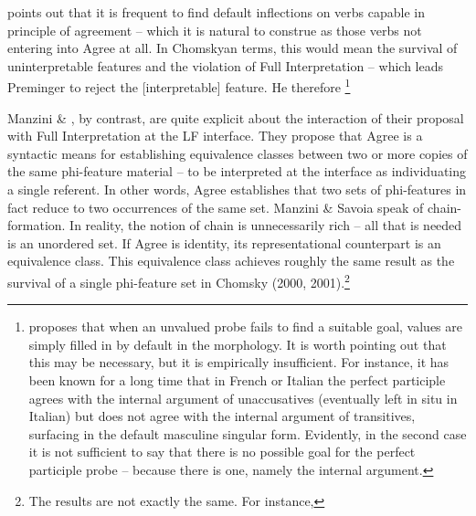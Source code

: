 \documentclass[output=paper]{langsci/langscibook}
\begin{document}
\citet{Preminger2014}{} points out that it is frequent to find default inflections on verbs capable in principle of agreement – which it is natural to construe as those verbs not entering into Agree at all.{} In Chomskyan terms, this would mean the survival of uninterpretable features and the violation of Full Interpretation – which leads Preminger to reject the [interpretable] feature. He therefore  \textstyle{[FB01?]}\footnote{\citet{Preminger2014} proposes that when an unvalued probe fails to find a suitable goal, values are simply filled in by default in the morphology. It is worth pointing out that this may be necessary, but it is empirically insufficient. For instance, it has been known for a long time \citep{Kayne1989} that in French or Italian the perfect participle agrees with the internal argument of unaccusatives (eventually left in situ in Italian) but does not agree with the internal argument of transitives, surfacing in the default masculine singular form. Evidently, in the second case it is not sufficient to say that there is no possible goal for the perfect participle probe – because there is one, namely the internal argument.} 

   Manzini \& \citet{Savoia2007}, by contrast, are quite explicit about the interaction of their proposal with Full Interpretation at the LF interface. They propose that Agree is a syntactic means for establishing equivalence classes between two or more copies of the same phi-feature material – to be interpreted at the interface as individuating a single referent. In other words, Agree establishes that two sets of phi-features in fact reduce to two occurrences of the same set. Manzini \& Savoia speak of chain-formation. In reality, the notion of chain is unnecessarily rich – all that is needed is an unordered set. If Agree is identity, its representational counterpart is an equivalence class. This equivalence class achieves roughly the same result as the survival of a single phi-feature set in Chomsky (2000, 2001).\footnote{The results are not exactly the same. For instance, }
\end{document}
